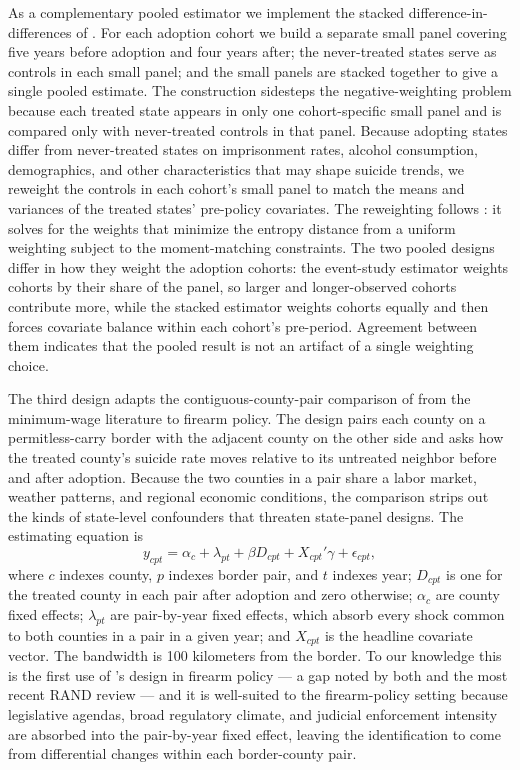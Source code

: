 \documentclass[12pt]{article}
\newcommand{\citepg}[2]{\citep[][p.~#2]{#1}}  %
\begin{document}
As a complementary pooled estimator we implement the stacked
difference-in-differences of \citet{cengiz2019}. For each adoption
cohort we build a separate small panel covering five years before
adoption and four years after; the never-treated states serve as
controls in each small panel; and the small panels are stacked
together to give a single pooled estimate. The construction
sidesteps the negative-weighting problem because each treated
state appears in only one cohort-specific small panel and is
compared only with never-treated controls in that panel. Because
adopting states differ from never-treated states on imprisonment
rates, alcohol consumption, demographics, and other characteristics
that may shape suicide trends, we reweight the controls in each
cohort's small panel to match the means and variances of the
treated states' pre-policy covariates. The reweighting follows
\citet{hainmueller2012}: it solves for the weights that minimize
the entropy distance from a uniform weighting subject to the
moment-matching constraints. The two pooled designs differ in how
they weight the adoption cohorts: the event-study estimator
weights cohorts by their share of the panel, so larger and
longer-observed cohorts contribute more, while the stacked
estimator weights cohorts equally and then forces covariate
balance within each cohort's pre-period. Agreement between them
indicates that the pooled result is not an artifact of a single
weighting choice.

The third design adapts the contiguous-county-pair comparison of
\citet{dube2010} from the minimum-wage literature to firearm
policy. The design pairs each county on a permitless-carry border
with the adjacent county on the other side and asks how the
treated county's suicide rate moves relative to its untreated
neighbor before and after adoption. Because the two counties in a
pair share a labor market, weather patterns, and regional economic
conditions, the comparison strips out the kinds of state-level
confounders that threaten state-panel designs. The estimating
equation is
\begin{equation*}
y_{cpt} = \alpha_c + \lambda_{pt} + \beta D_{cpt} + X_{cpt}'\gamma
        + \epsilon_{cpt},
\end{equation*}
where $c$ indexes county, $p$ indexes border pair, and $t$ indexes
year; $D_{cpt}$ is one for the treated county in each pair after
adoption and zero otherwise; $\alpha_c$ are county fixed effects;
$\lambda_{pt}$ are pair-by-year fixed effects, which absorb every
shock common to both counties in a pair in a given year; and
$X_{cpt}$ is the headline covariate vector. The bandwidth is 100
kilometers from the border. To our knowledge this is the first
use of \citet{dube2010}'s design in firearm policy --- a gap noted
by both \citet{anejadonohuezhang2014} and the most recent RAND
review \citepg{rand2024}{ch.~B} --- and it is well-suited to the
firearm-policy setting because legislative agendas, broad
regulatory climate, and judicial enforcement intensity are
absorbed into the pair-by-year fixed effect, leaving the
identification to come from differential changes within each
border-county pair.
\end{document}
